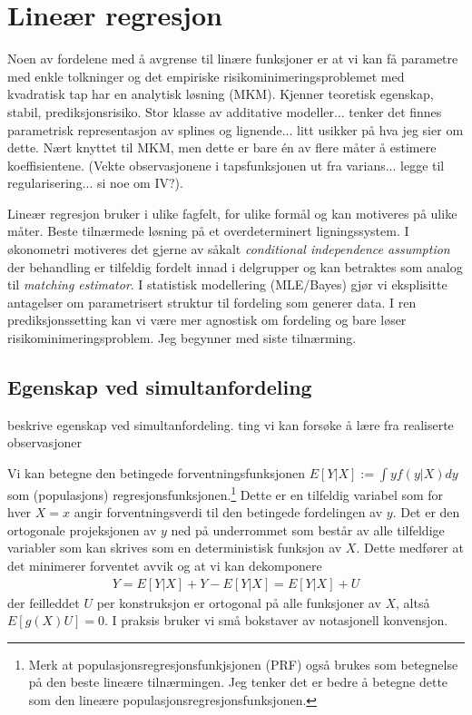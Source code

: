 \chapter{Lineær regresjon}
Noen av fordelene med å avgrense til linære funksjoner er at vi kan få parametre med enkle tolkninger og det empiriske risikominimeringsproblemet med kvadratisk tap har en analytisk løsning (MKM). Kjenner teoretisk egenskap, stabil, prediksjonsrisiko. Stor klasse av additative modeller... tenker det finnes parametrisk representasjon av splines og lignende... litt usikker på hva jeg sier om dette. Nært knyttet til MKM, men dette er bare én av flere måter å estimere koeffisientene. (Vekte observasjonene i tapsfunksjonen ut fra varians... legge til regularisering... si noe om IV?).

Lineær regresjon bruker i ulike fagfelt, for ulike formål og kan motiveres på ulike måter. Beste tilnærmede løsning på et overdeterminert ligningssystem. I økonometri motiveres det gjerne av såkalt \textit{conditional independence assumption} der behandling er tilfeldig fordelt innad i delgrupper og kan betraktes som analog til \textit{matching estimator}. I statistisk modellering (MLE/Bayes) gjør vi eksplisitte antagelser om parametrisert struktur til fordeling som generer data. I ren prediksjonssetting kan vi være mer agnostisk om fordeling og bare løser risikominimeringsproblem. Jeg begynner med siste tilnærming.
\section{Egenskap ved simultanfordeling}
beskrive egenskap ved simultanfordeling. ting vi kan forsøke å lære fra realiserte observasjoner

Vi kan betegne den betingede forventningsfunksjonen $E[Y|X] := \int y f(y|X) dy$ som (populasjons) regresjonsfunksjonen.\footnote{Merk at populasjonsregresjonsfunkjsjonen (PRF) også brukes som betegnelse på den beste lineære tilnærmingen. Jeg tenker det er bedre å betegne dette som den lineære populasjonsregresjonsfunksjonen.} Dette er en tilfeldig variabel som for hver $X=x$ angir forventningsverdi til den betingede fordelingen av $y$. Det er den ortogonale projeksjonen av $y$ ned på underrommet som består av alle tilfeldige variabler som kan skrives som en deterministisk funksjon av $X$. Dette medfører at det minimerer forventet avvik og at vi kan dekomponere
\begin{align}
Y = E[Y|X] + Y-E[Y|X] = E[Y|X] + U 
\end{align}
der feilleddet $U$ per konstruksjon er ortogonal på alle funksjoner av $X$, altså $E[g(X)U]=0$. I praksis bruker vi små bokstaver av notasjonell konvensjon.

